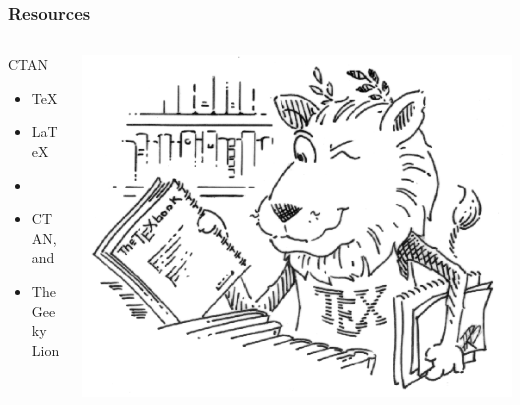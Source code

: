 \documentclass[]{beamer} %
\begin{document}
\begin{frame}[plain]%
\frametitle{Resources}
\begin{columns}[c]
\begin{column}{.25\textwidth}
\begin{block}{CTAN}
\footnotesize{
\begin{itemize}
  \item     \TeX
  \item     \LaTeX
  \item     \LaTeXe
  \item     CTAN, and
  \item     The Geeky Lion
\end{itemize}}
\end{block}
\end{column}

\begin{column}{.75\textwidth}
 \includegraphics[width=\textwidth]{Logo/CTAN_Lion.png}
\end{column}
\end{columns}
\end{frame}

%
\end{document}
